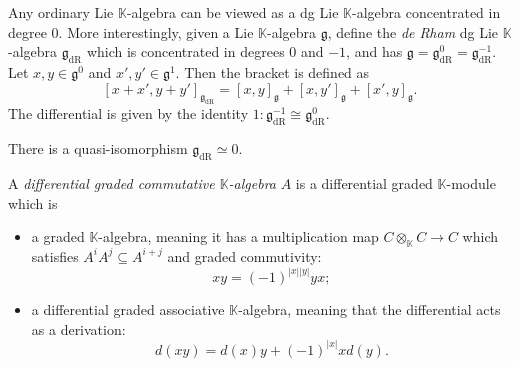 \begin{example}\label{3.2.2}
	Any ordinary Lie $\mathbb{K} $-algebra can be viewed as a dg Lie $\mathbb{K} $-algebra concentrated in degree 0. More interestingly, given a Lie $\mathbb{K} $-algebra $\mathfrak{g} $, define the \emph{de Rham} dg Lie $\mathbb{K} $-algebra $\mathfrak{g} _{\mathrm{dR} } $ which is concentrated in degrees 0 and $-1$, and has $\mathfrak{g} =\mathfrak{g} _{\mathrm{dR} }^0=\mathfrak{g}_{\mathrm{dR} }^{-1}$. Let $x,y\in \mathfrak{g} ^0$ and $x',y'\in \mathfrak{g} ^1$. Then the bracket is defined as
	\[
		[x+x',y+y']_{\mathfrak{g} _{\mathrm{dR} } }=[x,y]_{\mathfrak{g} } +[x,y']_{\mathfrak{g} } +[x',y]_{\mathfrak{g} } 
	.\]
	The differential is given by the identity $1 : \mathfrak{g}_{\mathrm{dR} } ^{-1} \cong \mathfrak{g} _{\mathrm{dR} } ^0$.
\end{example}

\begin{remark}\label{3.2.3}
	There is a quasi-isomorphism $\mathfrak{g} _{\mathrm{dR} } \simeq 0$.
\end{remark}

\begin{definition}\label{3.2.4}
	A \emph{differential graded commutative $\mathbb{K} $-algebra} $A$ is a differential graded $\mathbb{K} $-module which is
	\begin{itemize}
		\item a graded $\mathbb{K} $-algebra, meaning it has a multiplication map $C\otimes_\mathbb{K} C\to C$ which satisfies $A^iA^j \subseteq A^{i+j} $ and graded commutivity:
			\[
				xy=(-1)^{\left| x \right| \left| y \right| } yx
			;\]
		\item a differential graded associative $\mathbb{K}$-algebra, meaning that the differential acts as a derivation:
			\[
				d(xy) = d(x)y + (-1)^{\left| x \right| } xd(y)
			.\]
	\end{itemize}
\end{definition}

